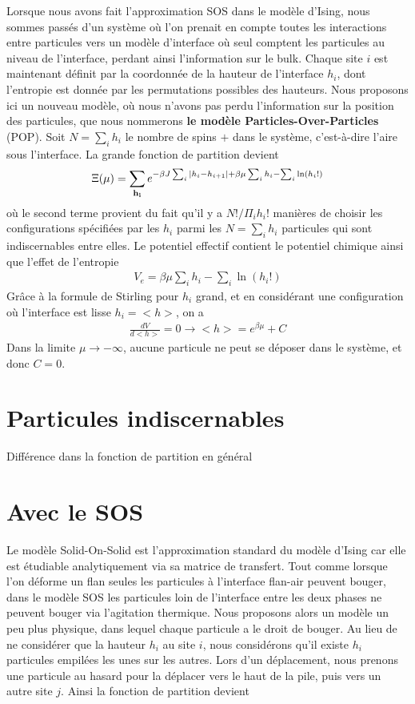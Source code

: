 Lorsque nous avons fait l'approximation SOS dans le modèle d'Ising, nous sommes passés d'un système où l'on prenait en compte toutes les interactions entre particules vers un modèle d'interface où seul comptent les particules au niveau de l'interface, perdant ainsi l'information sur le bulk. Chaque site $i$ est maintenant définit par la coordonnée de la hauteur de l'interface $h_i$, dont l'entropie est donnée par les permutations possibles des hauteurs.
Nous proposons ici un nouveau modèle, où nous n'avons pas perdu l'information sur la position des particules, que nous nommerons \textbf{le modèle Particles-Over-Particles} (POP). Soit $N = \sum_i h_i$ le nombre de spins $+$ dans le système, c'est-à-dire l'aire sous l'interface.
La grande fonction de partition devient
\begin{align}
    \Xi(\mu) = \sum_{{\bf h_i }} e^{- \beta J \sum_{i} |h_i-h_{i+1}| + \beta \mu \sum_i h_i  - \sum_i \ln(h_i !)} 
    \label{hamil-pop}
\end{align}
où le second terme provient du fait qu'il y a $N! / \Pi_i h_i! $ manières de choisir les configurations spécifiées par les $h_i$ parmi les $N = \sum_i h_i$ particules qui sont indiscernables entre elles. 
Le potentiel effectif contient le potentiel chimique ainsi que l'effet de l'entropie
\begin{align}
    V_e = \beta \mu \sum_i h_i - \sum_i \ln(h_i!)
\end{align}
Grâce à la formule de Stirling pour $h_i$ grand, et en considérant une configuration où l'interface est lisse $h_i = <h>$, on a
\begin{align}
    \frac{dV}{d<h>} = 0 \rightarrow <h> = e^{\beta \mu} + C
    \label{position-hauteur-pop}
\end{align}
Dans la limite $\mu \to -\infty$, aucune particule ne peut se déposer dans le système, et donc $C=0$.



	\section{Particules indiscernables}
	Différence dans la fonction de partition en général


	\section{Avec le SOS}
	Le modèle Solid-On-Solid est l'approximation standard du modèle d'Ising car elle est étudiable analytiquement via sa matrice de transfert. 	Tout comme lorsque l'on déforme un flan seules les particules à l'interface flan-air peuvent bouger, dans le modèle SOS les particules loin de l'interface entre les deux phases ne peuvent bouger via l'agitation thermique. 
	Nous proposons alors un modèle un peu plus physique, dans lequel chaque particule a le droit de bouger. Au lieu de ne considérer que la hauteur $h_i$ au site $i$, nous considérons qu'il existe $h_i$ particules empilées les unes sur les autres. Lors d'un déplacement, nous prenons une particule au hasard pour la déplacer vers le haut de la pile, puis vers un autre site $j$. 
	Ainsi la fonction de partition devient
	
